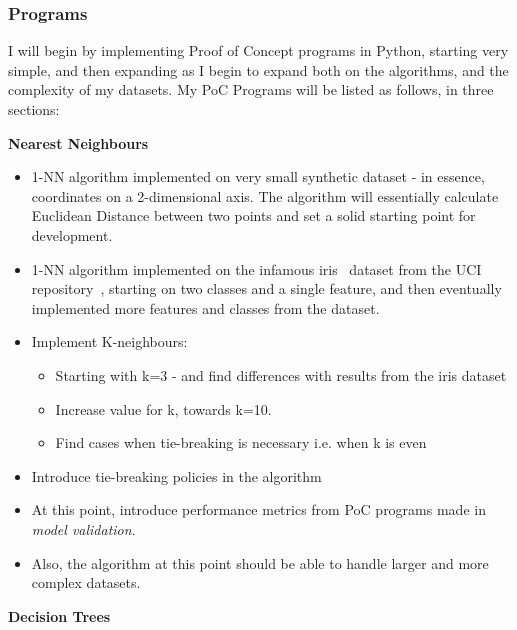 \documentclass[report,10pt]{article}
\begin{document}
\subsubsection{Programs}
I will begin by implementing Proof of Concept programs in Python, starting very simple, and then expanding as I begin to expand both on the algorithms, and the complexity of my datasets. My PoC Programs will be listed as follows, in three sections: \par
\textbf{Nearest Neighbours}
\begin{itemize}
    \item 1-NN algorithm implemented on very small synthetic dataset - in essence, coordinates on a 2-dimensional axis. The algorithm will essentially calculate Euclidean Distance between two points and set a solid starting point for development.
    \item 1-NN algorithm implemented on the infamous iris~\cite{irisdata} dataset from the UCI repository~\cite{uci}, starting on two classes and a single feature, and then eventually implemented more features and classes from the dataset.
    \item Implement K-neighbours:
    \begin{itemize}
        \item Starting with k=3 - and find differences with results from the iris dataset
        \item Increase value for k, towards k=10. 
        \item Find cases when tie-breaking is necessary i.e. when k is even
    \end{itemize}
    \item Introduce tie-breaking policies in the algorithm
    \item At this point, introduce performance metrics from PoC programs made in \textit{model validation}.
    \item Also, the algorithm at this point should be able to handle larger and more complex datasets.
\end{itemize}
\textbf{Decision Trees}
\end{document}
